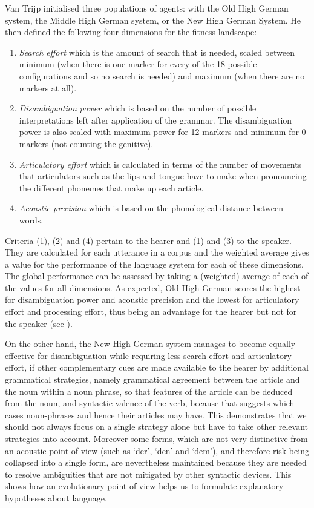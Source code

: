 Van Trijp initialised three populations of agents: with the Old High German system, 
the Middle High German system, or the New High German System. He then defined the following four dimensions for the 
fitness landscape: \enlargethispage{1\baselineskip}
\begin{enumerate}
\item {\itshape Search effort} which is the amount of search that is needed, scaled between minimum (when there is one marker for every of 
the 18 possible configurations and so no search is needed) and maximum (when there are no markers at all).
\item {\itshape Disambiguation power} which is based on the number of possible interpretations left after application of the grammar. 
The disambiguation power is also scaled with maximum power for 12 markers and minimum for 0 markers (not counting the genitive). 
\item {\itshape Articulatory effort} which is calculated in terms of the number of movements that articulators such as the lips and 
tongue have to make when pronouncing the different phonemes that make up each article. 
\item {\itshape Acoustic precision} which is based on the phonological distance between words.
\end{enumerate}
Criteria (1), (2) and (4) pertain to the hearer and (1) and (3) to the speaker. They are calculated for each utterance
in a corpus and the weighted average gives a value for the performance of the language system for each of these dimensions. The global 
performance can be assessed by taking a (weighted) average of each of the values for all dimensions. 
As expected, Old High German scores the highest for disambiguation power and acoustic precision and the lowest for articulatory effort 
and processing effort, thus being an advantage for the hearer but not for the speaker (see ). 

On the other hand, the New High German system manages to become equally effective for disambiguation while requiring less search effort
and articulatory effort, if other complementary cues are made available to the hearer by additional grammatical 
strategies, namely grammatical agreement between the article and the noun within a noun phrase, so 
that features of the article can be deduced from the noun, and syntactic valence of the verb, because that suggests
which cases noun-phrases and hence their articles may have. 
This demonstrates that we should not always focus on a single strategy alone 
but have to take other relevant strategies into account. 
Moreover some forms, which are not very distinctive from an acoustic point of 
view (such as `der', `den' and `dem'), and therefore risk being collapsed into a single form, are 
nevertheless maintained because they are needed to resolve ambiguities that are not mitigated by 
other syntactic devices. This shows how an evolutionary point of view helps us to formulate explanatory hypotheses about language. 

